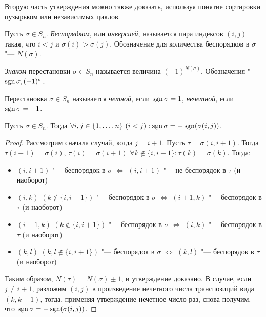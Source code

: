 \begin{note}
	Вторую часть утверждения можно также доказать, используя понятие сортировки пузырьком или независимых циклов.
\end{note}

\begin{definition}
	Пусть $\sigma \in S_n$. \textit{Беспорядком}, или \textit{инверсией}, называется пара индексов $(i, j)$ такая, что $i < j$ и $\sigma(i) > \sigma(j)$. Обозначение для количества беспорядков в $\sigma$ "--- $N(\sigma)$.
\end{definition}

\begin{definition}
	\textit{Знаком} перестановки $\sigma \in S_n$ называется величина $(-1)^{N(\sigma)}$. Обозначения "--- $\operatorname{sgn}{\sigma}, (-1)^{\sigma}$.
\end{definition}

\begin{definition}
	Перестановка $\sigma \in S_n$ называется \textit{четной}, если $\operatorname{sgn}{\sigma} = 1$, \textit{нечетной}, если $\operatorname{sgn}{\sigma} = -1$.
\end{definition}

\begin{proposition}
	Пусть $\sigma \in S_n$. Тогда $\forall i, j \in \{1, \dots, n\}~(i < j): \operatorname{sgn}{\sigma} = -\operatorname{sgn}(\sigma(i, j))$.
\end{proposition}

\begin{proof}
	Рассмотрим сначала случай, когда $j = i + 1$. Пусть $\tau = \sigma(i, i + 1)$. Тогда $\tau(i + 1) = \sigma(i)$, $\tau(i) = \sigma(i + 1)$ $\forall k \not\in \{i, i+1\}: \tau(k) = \sigma(k)$. Тогда:
	\begin{itemize}
		\item $(i, i+1)$ "--- беспорядок в $\sigma$ $\Leftrightarrow$ $(i, i+1)$ "--- не беспорядок в $\tau$ (и наоборот)
		\item $(i, k)$ $(k \not\in \{i, i+1\})$ "--- беспорядок в $\sigma$ $\Leftrightarrow$ $(i + 1, k)$ "--- беспорядок в $\tau$ (и наоборот)
		\item $(i+1, k)$ $(k \not\in \{i, i+1\})$ "--- беспорядок в $\sigma$ $\Leftrightarrow$ $(i, k)$ "--- беспорядок в $\tau$ (и наоборот)
		\item $(k, l)$ $(k, l \not\in \{i, i+1\})$ "--- беспорядок в $\sigma$ $\Leftrightarrow$ $(k, l)$ "--- беспорядок в $\tau$ (и наоборот)
	\end{itemize}

	Таким образом, $N(\tau) = N(\sigma) \pm 1$, и утверждение доказано. В случае, если $j \ne i + 1$, разложим $(i, j)$ в произведение нечетного числа транспозиций вида $(k, k + 1)$, тогда, применяя утверждение нечетное число раз, снова получим, что $\operatorname{sgn}{\sigma} = -\operatorname{sgn}(\sigma(i, j))$.
\end{proof}


